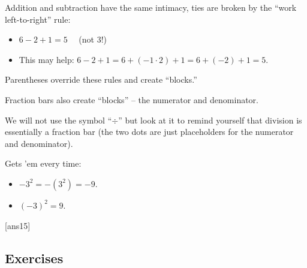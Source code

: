 \documentclass{amsbook}
\numberwithin{section}{chapter}
\numberwithin{equation}{chapter}
\newcommand{\qi}[1]{\begin{itemize}\item #1 \end{itemize}}
\begin{document}
Addition and subtraction have the same intimacy, ties are broken by the ``work left-to-right'' rule:
\qi{$6-2+1 = 5$ \ \ (not 3!)} 
\qi{This may help: $6-2+1 = 6+(-1\cdot2)+1 = 6+(-2)+1 = 5$.}

Parentheses override these rules and create ``blocks.''

Fraction bars also create ``blocks'' -- the numerator and denominator.

We will not use the symbol ``{\large $\div $}'' but look at it to remind yourself that division is essentially a fraction bar (the two dots are just placeholders for the numerator and denominator).

Gets 'em every time: 
\begin{itemize}
	\item $-3^2 = -\left(3^2\right) = -9$.
	\item $\left(-3\right)^2 = 9$.
\end{itemize}

[ans15]
\subsection*{Exercises \nopunct} \hfill
\end{document}
